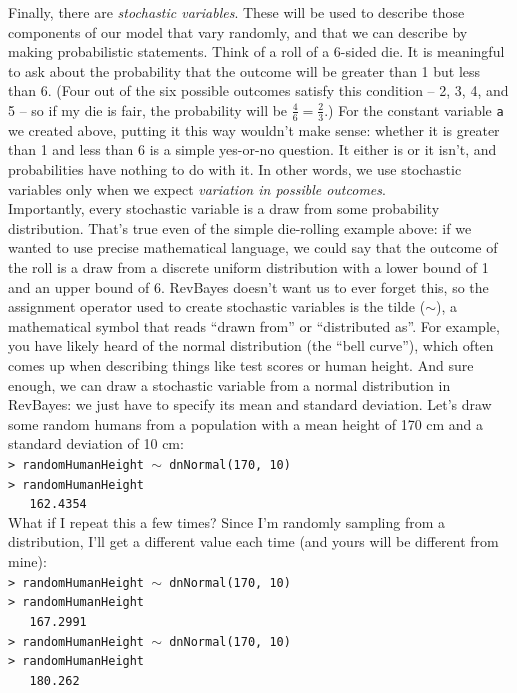 \documentclass[12pt]{article}
\begin{document}
\noindent Finally, there are \textit{stochastic variables}. These will be used to describe those components of our model that vary randomly, and that we can describe by making probabilistic statements. Think of a roll of a 6-sided die. It is meaningful to ask about the probability that the outcome will be greater than 1 but less than 6. (Four out of the six possible outcomes satisfy this condition -- 2, 3, 4, and 5 -- so if my die is fair, the probability will be $\frac{4}{6} = \frac{2}{3}$.) For the constant variable \texttt{a} we created above, putting it this way wouldn't make sense: whether it is greater than 1 and less than 6 is a simple yes-or-no question. It either is or it isn't, and probabilities have nothing to do with it. In other words, we use stochastic variables only when we expect \textit{variation in possible outcomes}. \\

\noindent Importantly, every stochastic variable is a draw from some probability distribution. That's true even of the simple die-rolling example above: if we wanted to use precise mathematical language, we could say that the outcome of the roll is a draw from a discrete uniform distribution with a lower bound of 1 and an upper bound of 6. RevBayes doesn't want us to ever forget this, so the assignment operator used to create stochastic variables is the tilde (\texttt{\footnotesize $\sim$}), a mathematical symbol that reads ``drawn from'' or ``distributed as''. For example, you have likely heard of the normal distribution (the ``bell curve''), which often comes up when describing things like test scores or human height. And sure enough, we can draw a stochastic variable from a normal distribution in RevBayes: we just have to specify its mean and standard deviation. Let's draw some random humans from a population with a mean height of 170 cm and a standard deviation of 10 cm: \\

\indent \texttt{> randomHumanHeight {\footnotesize $\sim$} dnNormal(170, 10)} \\
\indent \texttt{> randomHumanHeight} \\
\indent \texttt{\ \ \ 162.4354} \\

\noindent What if I repeat this a few times? Since I'm randomly sampling from a distribution, I'll get a different value each time (and yours will be different from mine): \\

\indent \texttt{> randomHumanHeight {\footnotesize $\sim$} dnNormal(170, 10)} \\
\indent \texttt{> randomHumanHeight} \\
\indent \texttt{\ \ \ 167.2991} \\
\indent \texttt{> randomHumanHeight {\footnotesize $\sim$} dnNormal(170, 10)} \\
\indent \texttt{> randomHumanHeight} \\
\indent \texttt{\ \ \ 180.262}
\end{document}

